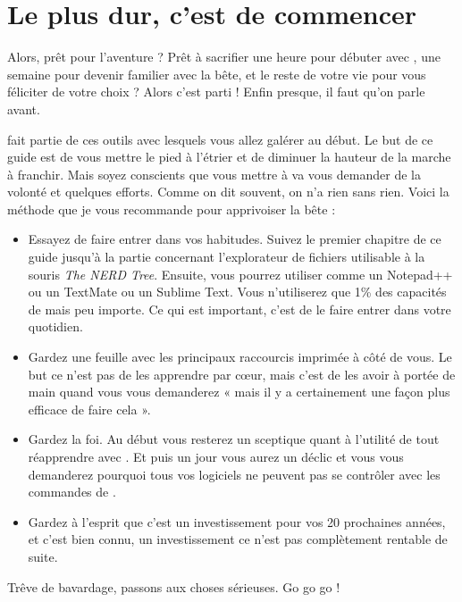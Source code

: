 \section{Le plus dur, c'est de commencer}

Alors, prêt pour l'aventure ? Prêt à sacrifier une heure pour débuter avec \vim, une semaine pour devenir familier avec la bête, et le reste de votre vie pour vous féliciter de votre choix ? Alors c'est parti ! Enfin presque, il faut qu'on parle avant.

\vim fait partie de ces outils avec lesquels vous allez galérer au début. Le but de ce guide est de vous mettre le pied à l'étrier et de diminuer la hauteur de la marche à franchir. Mais soyez conscients que vous mettre à \vim va vous demander de la volonté et quelques efforts. Comme on dit souvent, on n'a rien sans rien. Voici la méthode que je vous recommande pour apprivoiser la bête :

\begin{itemize}
    \item Essayez de faire entrer \vim dans vos habitudes. Suivez le premier chapitre de ce guide jusqu'à la partie concernant l'explorateur de fichiers utilisable à la souris \emph{The NERD Tree}. Ensuite, vous pourrez utiliser \vim comme un Notepad++ ou un TextMate ou un Sublime Text. Vous n'utiliserez que 1\% des capacités de \vim mais peu importe. Ce qui est important, c'est de le faire entrer dans votre quotidien.
    \item Gardez une feuille avec les principaux raccourcis imprimée à côté de vous. Le but ce n'est pas de les apprendre par cœur, mais c'est de les avoir à portée de main quand vous vous demanderez « mais il y a certainement une façon plus efficace de faire cela ».
    \item Gardez la foi. Au début vous resterez un sceptique quant à l'utilité de tout réapprendre avec \vim. Et puis un jour vous aurez un déclic et vous vous demanderez pourquoi tous vos logiciels ne peuvent pas se contrôler avec les commandes de \vim.
    \item Gardez à l'esprit que c'est un investissement pour vos 20 prochaines années, et c'est bien connu, un investissement ce n'est pas complètement rentable de suite.
\end{itemize}

\bigskip

Trêve de bavardage, passons aux choses sérieuses. Go go go !
